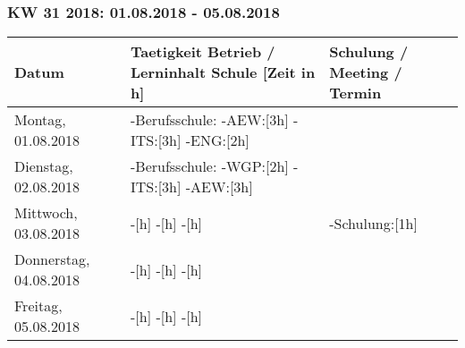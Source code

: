 \documentclass{pfdoc}
\begin{document}
\subsubsection{KW 31 2018: 01.08.2018 - 05.08.2018}
\begin{tabular}{|L{2cm}|L{10cm}|L{5cm}|}
\hline
\textbf{Datum} & \textbf{Taetigkeit Betrieb / Lerninhalt Schule [Zeit in h]} & \textbf{Schulung / Meeting / Termin} \\
\hline
Montag, 01.08.2018
&
-Berufsschule: \linebreak
-AEW:[3h] \linebreak
-ITS:[3h] \linebreak
-ENG:[2h] \linebreak
&
\\
\hline
Dienstag, 02.08.2018
&
-Berufsschule: \linebreak
-WGP:[2h] \linebreak
-ITS:[3h] \linebreak
-AEW:[3h] \linebreak
&
\\
\hline
Mittwoch, 03.08.2018
&
-[h] \linebreak
-[h] \linebreak
-[h] \linebreak
&
-Schulung:[1h] \linebreak
\\
\hline
Donnerstag, 04.08.2018
&
-[h] \linebreak
-[h] \linebreak
-[h] \linebreak
&
\\
\hline
Freitag, 05.08.2018
&
-[h] \linebreak
-[h] \linebreak
-[h] \linebreak
&
\\
\hline
\end{tabular}
\vfill
{}


\newpage
\end{document}
